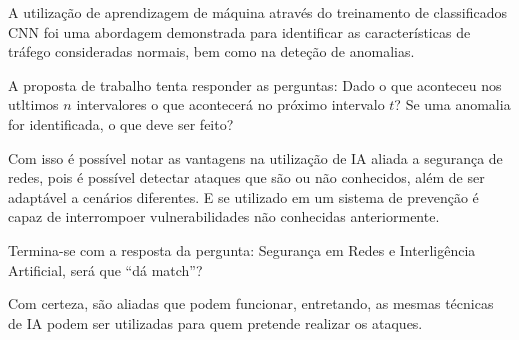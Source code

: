 A utilização de aprendizagem de máquina através do treinamento de classificados CNN foi uma abordagem demonstrada para identificar as características de tráfego consideradas normais, bem como na deteção de anomalias.

A proposta de trabalho tenta responder as perguntas: Dado o que aconteceu nos utltimos $n$ intervalores o que acontecerá no próximo intervalo $t$? Se uma anomalia for identificada, o que deve ser feito?

Com isso é possível notar as vantagens na utilização de IA aliada a segurança de redes, pois é possível detectar ataques que são ou não conhecidos, além de ser adaptável a cenários diferentes. E se utilizado em um sistema de prevenção é capaz de interrompoer vulnerabilidades não conhecidas anteriormente.

Termina-se com a resposta da pergunta: Segurança em Redes e Interligência Artificial, será que ``dá match''?

Com certeza, são aliadas que podem funcionar, entretando, as mesmas técnicas de IA podem ser utilizadas para quem pretende realizar os ataques.